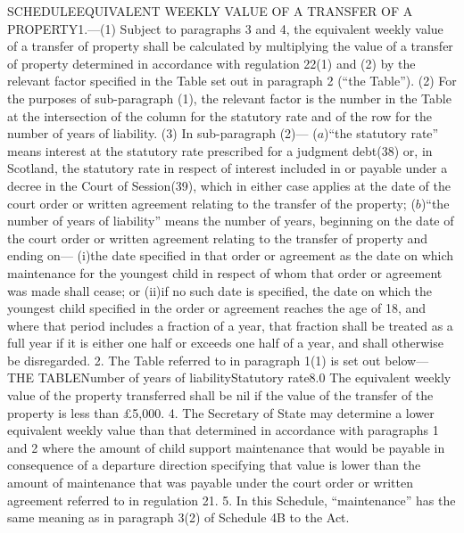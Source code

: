 \documentclass[a4paper]{article}
\begin{document}
SCHEDULEEQUIVALENT WEEKLY VALUE OF A TRANSFER OF A PROPERTY1.—(1) Subject to
paragraphs 3 and 4, the equivalent weekly value of a transfer of property shall
be calculated by multiplying the value of a transfer of property determined in
accordance with regulation 22(1) and (2) by the relevant factor specified in the
Table set out in paragraph 2 (“the Table”).
(2) For the purposes of sub-paragraph (1), the relevant factor is the number in
the Table at the intersection of the column for the statutory rate and of the
row for the number of years of liability.
(3) In sub-paragraph (2)—
($a$)“the statutory rate” means interest at the statutory rate prescribed for a
judgment debt(38) or, in Scotland, the statutory rate in respect of interest
included in or payable under a decree in the Court of Session(39), which in
either case applies at the date of the court order or written agreement relating
to the transfer of the property;
($b$)“the number of years of liability” means the number of years, beginning on
the date of the court order or written agreement relating to the transfer of
property and ending on—
(i)the date specified in that order or agreement as the date on which
maintenance for the youngest child in respect of whom that order or agreement
was made shall cease; or
(ii)if no such date is specified, the date on which the youngest child specified
in the order or agreement reaches the age of 18,
and where that period includes a fraction of a year, that fraction shall be
treated as a full year if it is either one half or exceeds one half of a year,
and shall otherwise be disregarded.
2.  The Table referred to in paragraph 1(1) is set out below—
THE TABLENumber of years of liabilityStatutory
rate8.0%
The equivalent weekly value of the property transferred shall be nil if the
value of the transfer of the property is less than £5,000.
4. The Secretary of State may determine a lower equivalent weekly value than
that determined in accordance with paragraphs 1 and 2 where the amount of child
support maintenance that would be payable in consequence of a departure
direction specifying that value is lower than the amount of maintenance that was
payable under the court order or written agreement referred to in regulation 21.
5. In this Schedule, “maintenance” has the same meaning as in paragraph 3(2) of
Schedule 4B to the Act.
\end{document}
